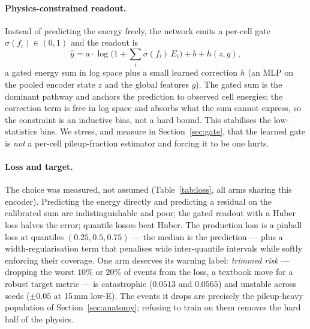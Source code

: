 \documentclass[11pt,a4paper]{article}
\begin{document}
\paragraph{Physics-constrained readout.} Instead of predicting the energy
freely, the network emits a per-cell gate $\sigma(f_i)\in(0,1)$ and the
readout is
\begin{equation}
\hat{y} = a \cdot \log\!\Big(1 + \sum_i \sigma(f_i)\, E_i\Big) + b
          + h(z, g),
\label{eq:readout}
\end{equation}
a gated energy sum in log space plus a small learned correction $h$ (an MLP
on the pooled encoder state $z$ and the global features $g$). The gated sum
is the dominant pathway and anchors the prediction to observed cell
energies; the correction term is free in log space and absorbs what the sum
cannot express, so the constraint is an inductive bias, not a hard bound.
This stabilises the low-statistics bins. We stress, and measure in
Section~\ref{sec:gate}, that the learned gate is \emph{not} a per-cell
pileup-fraction estimator and forcing it to be one hurts.

\paragraph{Loss and target.} The choice was measured, not assumed
(Table~\ref{tab:loss}, all arms sharing this encoder). Predicting the energy
directly and predicting a residual on the calibrated sum are
indistinguishable and poor; the gated readout with a Huber loss halves the
error; quantile losses beat Huber. The production loss is a pinball loss at
quantiles $(0.25, 0.5, 0.75)$ --- the median is the prediction --- plus a
width-regularisation term that penalises wide inter-quantile intervals while
softly enforcing their coverage. One arm deserves its warning label:
\emph{trimmed risk} --- dropping the worst $10\%$ or $20\%$ of events from
the loss, a textbook move for a robust target metric --- is catastrophic
($0.0513$ and $0.0565$) and unstable across seeds ($\pm 0.05$ at 15\,mm
low-E). The events it drops are precisely the pileup-heavy population of
Section~\ref{sec:anatomy}; refusing to train on them removes the hard half
of the physics.
\end{document}
